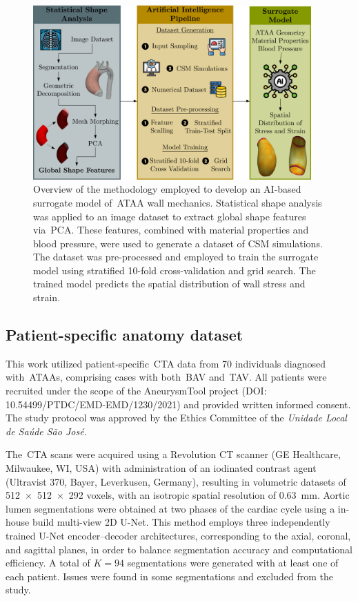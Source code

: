 \documentclass[a4paper,fleqn]{cas-sc}
\begin{document}
\begin{figure}
  \centering
  \includegraphics[width=0.95\textwidth]{fig1}
  \caption{Overview of the methodology employed to develop an AI-based surrogate model of~\gls{ATAA} wall mechanics. Statistical shape analysis was applied to an image dataset to extract global shape features via~\gls{PCA}. These features, combined with material properties and blood pressure, were used to generate a dataset of CSM simulations. The dataset was pre-processed and employed to train the surrogate model using stratified 10-fold cross-validation and grid search. The trained model predicts the spatial distribution of wall stress and strain.}
  \label{fig:workflow}
\end{figure}

\subsection{Patient-specific anatomy dataset}
  This work utilized patient-specific~\gls{CTA} data from 70 individuals diagnosed with~\glspl{ATAA}, comprising cases with both~\gls{BAV} and~\gls{TAV}. All patients were recruited under the scope of the AneurysmTool project (DOI: 10.54499/PTDC/EMD-EMD/1230/2021) and provided written informed consent. The study protocol was approved by the Ethics Committee of the \textit{Unidade Local de Saúde São José}.

  The~\gls{CTA} scans were acquired using a Revolution CT scanner (GE Healthcare, Milwaukee, WI, USA) with administration of an iodinated contrast agent (Ultravist 370, Bayer, Leverkusen, Germany), resulting in volumetric datasets of 512~$\times$~512~$\times$~292 voxels, with an isotropic spatial resolution of 0.63~\si{\milli\meter}. Aortic lumen segmentations were obtained at two phases of the cardiac cycle using a in-house build multi-view 2D U-Net. This method employs three independently trained U-Net encoder–decoder architectures, corresponding to the axial, coronal, and sagittal planes, in order to balance segmentation accuracy and computational efficiency. A total of $K=94$ segmentations were generated with at least one of each patient. Issues were found in some segmentations and excluded from the study.
\end{document}
